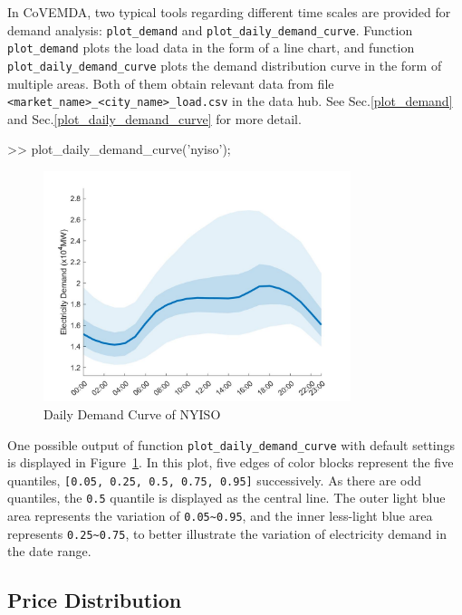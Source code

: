 \documentclass[10pt]{article}
\newcommand{\covemda}{CoVEMDA}
\numberwithin{equation}{section}
\numberwithin{table}{section}
\numberwithin{figure}{section}
\begin{document}
In \covemda{}, two typical tools regarding different time scales are provided for demand analysis: \verb!plot_demand! and \verb!plot_daily_demand_curve!. Function \verb!plot_demand! plots the load data in the form of a line chart, and function \verb!plot_daily_demand_curve! plots the demand distribution curve in the form of multiple areas. Both of them obtain relevant data from file \verb!<market_name>_<city_name>_load.csv! in the data hub. See Sec.\ref{plot_demand} and Sec.\ref{plot_daily_demand_curve} for more detail.

\begin{Code}
>> plot_daily_demand_curve('nyiso');
\end{Code}

\begin{figure}
  \centering
  \noindent\includegraphics[width=0.8\textwidth]{figures/visualization_plot_daily_demand_curve.jpg}
  \caption{Daily Demand Curve of NYISO} \label{fig:vis_1}
\end{figure}

One possible output of function \verb!plot_daily_demand_curve! with default settings is displayed in Figure~\ref{fig:vis_1}. In this plot, five edges of color blocks represent the five quantiles, \verb![0.05, 0.25, 0.5, 0.75, 0.95]! successively. As there are odd quantiles, the \verb!0.5! quantile is displayed as the central line. The outer light blue area represents the variation of \verb!0.05~0.95!, and the inner less-light blue area represents \verb!0.25~0.75!, to better illustrate the variation of electricity demand in the date range.



\subsection{Price Distribution}
\end{document}
